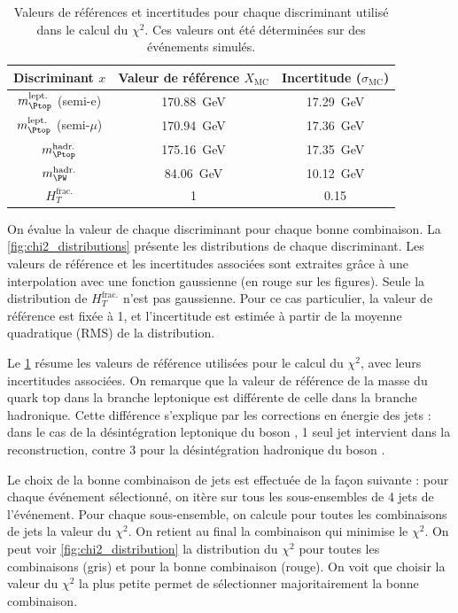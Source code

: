 \begin{table} \centering
    \begin{tabular}{@{}ccc@{}} \toprule
        Discriminant $x$& Valeur de référence $X_\text{MC}$ & Incertitude ($\sigma_\text{MC}$) \\ \midrule
        $m_{\Ptop}^{\text{lept.}}$ (semi-e) & \SI{170.88}{\GeV} & \SI{17.29}{\GeV} \\
        $m_{\Ptop}^{\text{lept.}}$ (semi-$\mu$) & \SI{170.94}{\GeV} & \SI{17.36}{\GeV} \\
        $m_{\Ptop}^{\text{hadr.}}$ & \SI{175.16}{\GeV} & \SI{17.35}{\GeV} \\
        $m_{\PW}^{\text{hadr.}}$ & \SI{84.06}{\GeV} & \SI{10.12}{\GeV} \\
        $H_{T}^{\text{frac.}}$ & \num{1} & \num{0.15} \\ \bottomrule
    \end{tabular}
    \caption{Valeurs de références et incertitudes pour chaque discriminant utilisé dans le calcul du $\chi^2$. Ces valeurs ont été déterminées sur des événements \ttbar simulés.}
    \label{tab:chi2_ref_values}
\end{table}

On évalue la valeur de chaque discriminant pour chaque bonne combinaison. La \cref{fig:chi2_distributions} présente les distributions de chaque discriminant. Les valeurs de référence et les incertitudes associées sont extraites grâce à une interpolation avec une fonction gaussienne (en rouge sur les figures). Seule la distribution de $H_T^\text{frac.}$ n'est pas gaussienne. Pour ce cas particulier, la valeur de référence est fixée à 1, et l'incertitude est estimée à partir de la moyenne quadratique (RMS) de la distribution.

Le \cref{tab:chi2_ref_values} résume les valeurs de référence utilisées pour le calcul du $\chi^2$, avec leurs incertitudes associées. On remarque que la valeur de référence de la masse du quark top dans la branche leptonique est différente de celle dans la branche hadronique. Cette différence s'explique par les corrections en énergie des jets : dans le cas de la désintégration leptonique du boson \PW, 1 seul jet intervient dans la reconstruction, contre 3 pour la désintégration hadronique du boson \PW.

\bigskip

Le choix de la bonne combinaison de jets est effectuée de la façon suivante : pour chaque événement sélectionné, on itère sur tous les sous-ensembles de 4 jets de l'événement. Pour chaque sous-ensemble, on calcule pour toutes les combinaisons de jets la valeur du $\chi^2$. On retient au final la combinaison qui minimise le $\chi^2$. On peut voir \cref{fig:chi2_distribution} la distribution du $\chi^2$ pour toutes les combinaisons (gris) et pour la bonne combinaison (rouge). On voit que choisir la valeur du $\chi^2$ la plus petite permet de sélectionner majoritairement la bonne combinaison.

